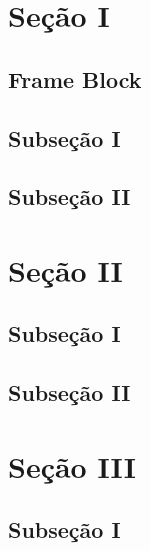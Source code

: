 \documentclass[aspectratio=169]{beamer}
\begin{document}
\newcommand{\github}{github.com/physikices}
\newcommand{\email}{institutional@edu.udesc.br}
\newcommand{\website}{}
\capa

\section{Seção I}
\subsection{Frame Block}
\subsection{Subseção I}
\subsection{Subseção II}

\section{Seção II}
\subsection{Subseção I}
\subsection{Subseção II}

\section{Seção III}
\subsection{Subseção I}
\end{document}
